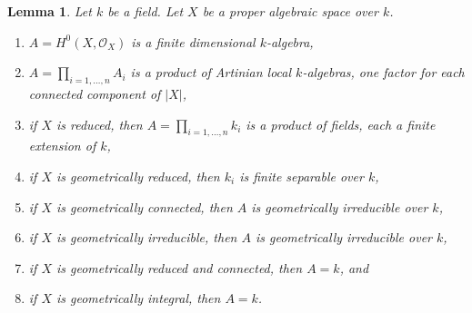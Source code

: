 \documentclass{stacks-project}
\theoremstyle{plain}
\newtheorem{lemma}[subsection]{Lemma}
\theoremstyle{definition}
\theoremstyle{remark}
\numberwithin{equation}{subsection}
\begin{document}
\begin{lemma}
\label{lemma-proper-geometrically-reduced-global-sections}
Let $k$ be a field. Let $X$ be a proper algebraic space over $k$.
\begin{enumerate}
\item $A = H^0(X, \mathcal{O}_X)$ is a finite dimensional $k$-algebra,
\item $A = \prod_{i = 1, \ldots, n} A_i$ is a product of Artinian
local $k$-algebras, one factor for each connected component of $|X|$,
\item if $X$ is reduced, then $A = \prod_{i = 1, \ldots, n} k_i$
is a product of fields, each a finite extension of $k$,
\item if $X$ is geometrically reduced, then $k_i$ is finite separable
over $k$,
\item if $X$ is geometrically connected, then $A$ is geometrically
irreducible over $k$,
\item if $X$ is geometrically irreducible, then $A$ is geometrically
irreducible over $k$,
\item if $X$ is geometrically reduced and connected, then $A = k$, and
\item if $X$ is geometrically integral, then $A = k$.
\end{enumerate}
\end{lemma}
\end{document}
